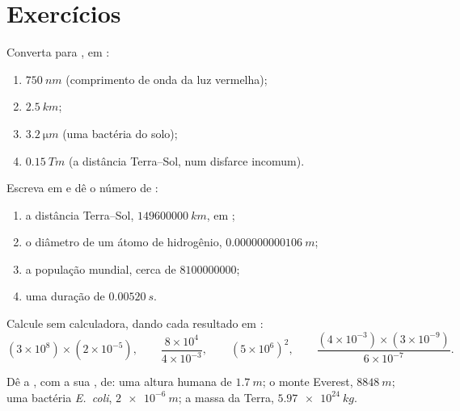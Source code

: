 \section{Exercícios}

\begin{exercise}[$\star$]\label{exo:g10:orders-of-magnitude:1}
Converta para , em :
\begin{enumerate}
  \item $\qty{750}{nm}$ (comprimento de onda da luz vermelha);
  \item $\qty{2.5}{km}$;
  \item $\qty{3.2}{\micro m}$ (uma bactéria do solo);
  \item $\qty{0.15}{Tm}$ (a distância Terra--Sol, num disfarce
        incomum).
\end{enumerate}
\end{exercise}

\begin{exercise}[$\star$]\label{exo:g10:orders-of-magnitude:2}
Escreva em  e dê o número de :
\begin{enumerate}
  \item a distância Terra--Sol, $\qty{149600000}{km}$, em ;
  \item o diâmetro de um átomo de hidrogênio,
        $\qty{0.000000000106}{m}$;
  \item a população mundial, cerca de $\num{8100000000}$;
  \item uma duração de $\qty{0.00520}{s}$.
\end{enumerate}
\end{exercise}

\begin{exercise}[$\star$]\label{exo:g10:orders-of-magnitude:3}
Calcule sem calculadora, dando cada resultado em :
\[
(3\times10^{8})\times(2\times10^{-5}), \qquad
\frac{8\times10^{4}}{4\times10^{-3}}, \qquad
(5\times10^{6})^{2}, \qquad
\frac{(4\times10^{-3})\times(3\times10^{-9})}{6\times10^{-7}} .
\]
\end{exercise}

\begin{exercise}[$\star$]\label{exo:g10:orders-of-magnitude:4}
Dê a , com a sua , de: uma altura humana de
$\qty{1.7}{m}$; o monte Everest, $\qty{8848}{m}$; uma bactéria
\emph{E.~coli}, $\qty{2e-6}{m}$; a massa da Terra, $\qty{5.97e24}{kg}$.
\end{exercise}

